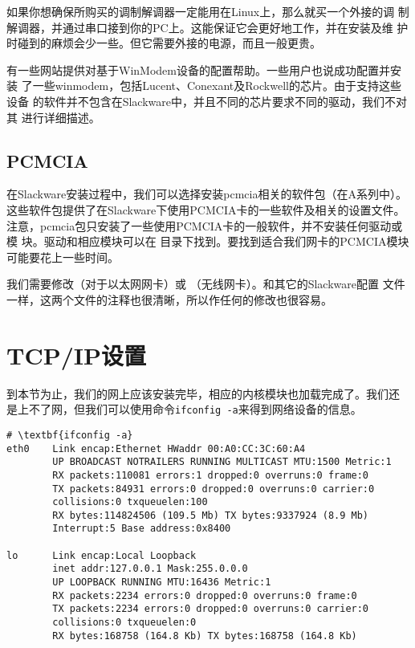 如果你想确保所购买的调制解调器一定能用在Linux上，那么就买一个外接的调
制解调器，并通过串口接到你的PC上。这能保证它会更好地工作，并在安装及维
护时碰到的麻烦会少一些。但它需要外接的电源，而且一般更贵。

有一些网站提供对基于WinModem设备的配置帮助。一些用户也说成功配置并安装
了一些winmodem，包括Lucent、Conexant及Rockwell的芯片。由于支持这些设备
的软件并不包含在Slackware中，并且不同的芯片要求不同的驱动，我们不对其
进行详细描述。

\subsection{PCMCIA}
\label{sec:networkConfiguration:hardware:pcmcia}
在Slackware安装过程中，我们可以选择安装pcmcia相关的软件包（在A系列中）。
这些软件包提供了在Slackware下使用PCMCIA卡的一些软件及相关的设置文件。
注意，pcmcia包只安装了一些使用PCMCIA卡的一般软件，并不安装任何驱动或模
块。驱动和相应模块可以在
目录下找到。要找到适合我们网卡的PCMCIA模块可能要花上一些时间。

我们需要修改（对于以太网网卡）或
（无线网卡）。和其它的Slackware配置
文件一样，这两个文件的注释也很清晰，所以作任何的修改也很容易。

\section{TCP/IP设置}
\label{sec:networkConfiguration:tcpIP}

到本节为止，我们的网上应该安装完毕，相应的内核模块也加载完成了。我们还
是上不了网，但我们可以使用命令\texttt{ifconfig -a}来得到网络设备的信息。

\begin{Verbatim}[frame=single, commandchars=\\\{\}]
# \textbf{ifconfig -a}
eth0    Link encap:Ethernet HWaddr 00:A0:CC:3C:60:A4
        UP BROADCAST NOTRAILERS RUNNING MULTICAST MTU:1500 Metric:1
        RX packets:110081 errors:1 dropped:0 overruns:0 frame:0
        TX packets:84931 errors:0 dropped:0 overruns:0 carrier:0
        collisions:0 txqueuelen:100
        RX bytes:114824506 (109.5 Mb) TX bytes:9337924 (8.9 Mb)
        Interrupt:5 Base address:0x8400
        
lo      Link encap:Local Loopback
        inet addr:127.0.0.1 Mask:255.0.0.0
        UP LOOPBACK RUNNING MTU:16436 Metric:1
        RX packets:2234 errors:0 dropped:0 overruns:0 frame:0
        TX packets:2234 errors:0 dropped:0 overruns:0 carrier:0
        collisions:0 txqueuelen:0
        RX bytes:168758 (164.8 Kb) TX bytes:168758 (164.8 Kb)
\end{Verbatim}

